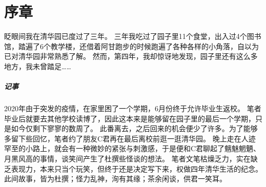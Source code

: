 \chapter{序章}

眨眼间我在清华园已度过了三年。
三年我吃过了园子里11个食堂，出入过4个图书馆，踏遍了6个教学楼，还借着阿甘跑步的时候跑遍了各种各样的小角落，自以为已对清华园非常熟悉了解。
然而，第四年，我却惊讶地发现，园子里还有这么多地方，我未曾踏足……

\vfill

\paragraph{记事}
2020年由于突发的疫情，在家里困了一个学期，6月份终于允许毕业生返校。
笔者毕业后就要去其他学校读博了，因此这本来是能够留在园子里的最后一个学期，只是如今仅剩下寥寥的数周了。
此番离去，之后回来的机会便少了许多。为了能够多留下些回忆，笔者约了朋友C君再在最后离校前逛一逛清华园。
晚上走在人迹罕至的小路上，就会有一种微妙的紧张与刺激感，于是便和C君聊起了魑魅魍魉、月黑风高的事情，谈笑间产生了杜撰些怪谈的想法。
笔者文笔枯燥乏力，实在缺乏表现力，本来只当个玩笑，但终于还是决定写下来，权做四年清华生活的纪念。
此间故事，皆为杜撰；怪力乱神，洵有其缘；茶余闲谈，供君一笑耳。

